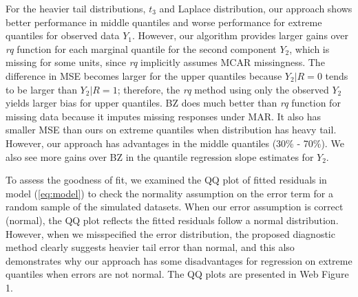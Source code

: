 \documentclass[useAMS,usenatbib,referee]{biom}
\begin{document}
For the heavier tail distributions, $t_3$ and Laplace distribution,
our approach shows better performance in middle quantiles and worse
performance for extreme quantiles for observed data $Y_1$. However,
our algorithm provides larger gains over \textit{rq} function for each
marginal quantile for the second component $Y_2$, which is missing for
some units, since \textit{rq} implicitly assumes MCAR missingness.  The
difference in MSE becomes larger for the upper quantiles because $Y_2
|R = 0$ tends to be larger than $Y_2 | R = 1$; therefore, the
\textit{rq} method using only the observed $Y_2$ yields larger bias
for upper quantiles. BZ does much better than
\textit{rq} function for missing data because it imputes missing
responses under MAR.  It also has smaller MSE than ours on extreme
quantiles when distribution has heavy tail. However, our approach has
advantages in the middle quantiles (30\% - 70\%).  We also see more
gains over BZ in the quantile regression slope estimates for
$Y_2$.

To assess the goodness of fit, we examined the QQ plot of fitted
residuals in model (\ref{eq:model}) to check the normality assumption
on the error term for a random sample of the simulated datasets.
When our error assumption is correct
(normal), the QQ plot reflects the fitted residuals follow  a
normal distribution. However, when we misspecified the error
distribution, the proposed diagnostic method clearly suggests
heavier tail error than normal, and this also demonstrates why our
approach has some disadvantages for regression on extreme quantiles
when errors are not normal.
The QQ plots are presented in Web Figure 1.
\end{document}

